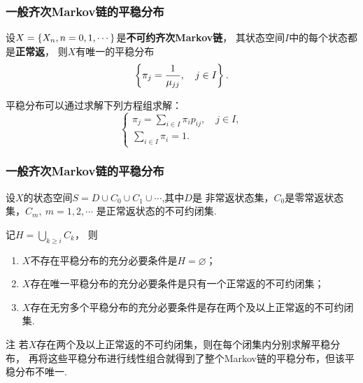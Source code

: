 \begin{frame}
    \frametitle{一般齐次Markov链的平稳分布}
    \begin{mytheorem}[不可约正常返链]
        设$X=\left\{X_n,n=0,1,\cdots\right\}$是\textbf{不可约齐次Markov链}，
        其状态空间$I$中的每个状态都是\textbf{正常返}，
        则$X$有唯一的平稳分布
        \begin{equation*}
            \left\{\pi_j=\frac1{\mu_{jj}},\quad j\in I\right\}.
        \end{equation*}

        平稳分布可以通过求解下列方程组求解：
        \begin{equation*}
            \begin{cases}
                \pi_j=\displaystyle\sum_{i\in I}\pi_i p_{ij},\quad j\in I,\\
                \displaystyle\sum_{i\in I}\pi_i=1.
            \end{cases}
        \end{equation*}
    \end{mytheorem}
\end{frame}

\begin{frame}
    \frametitle{一般齐次Markov链的平稳分布}
    \begin{mytheorem}[一般齐次Markov链]
        设$X$的状态空间$S=D\cup C_0\cup C_1\cup\cdots$,其中$D$是
        非常返状态集，$C_0$是零常返状态集，$C_m,\ m=1,2,\cdots$
        是正常返状态的不可约闭集. 
        
        记$
            H=\displaystyle\bigcup_{k\geqslant i}C_k
        $，
        则\begin{enumerate}
            \item $X$不存在平稳分布的充分必要条件是$H=\varnothing$；
            \item $X$存在唯一平稳分布的充分必要条件是只有一个正常返的不可约闭集；
            \item $X$存在无穷多个平稳分布的充分必要条件是存在两个及以上正常返的不可约闭集. 
        \end{enumerate}
    \end{mytheorem}
    \begin{block}{注}
        若$X$存在两个及以上正常返的不可约闭集，则在每个闭集内分别求解平稳分布，
        再将这些平稳分布进行线性组合就得到了整个Markov链的平稳分布，但该平稳分布不唯一.
    \end{block}
\end{frame}